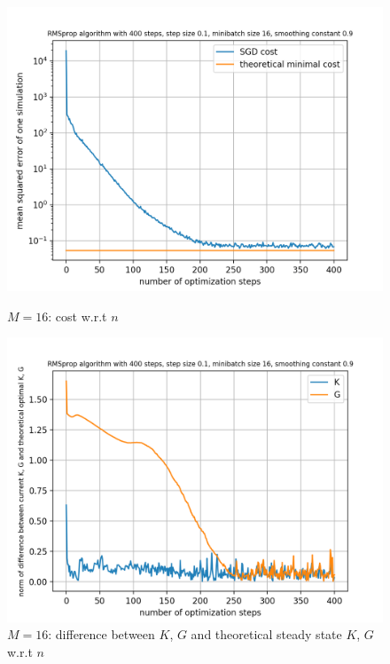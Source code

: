 \documentclass{article}
\begin{document}
\begin{figure}[h!]
	\centering
	\begin{minipage}[t]{.28\paperwidth}
		\centering
		\includegraphics[width=1.0\textwidth]{Figures/M16.png}
		\caption{$M=16$: cost w.r.t $n$}
	\end{minipage}%
	\begin{minipage}[t]{.28\paperwidth}
		\centering
		\includegraphics[width=1.0\textwidth]{Figures/d_M16.png}
		\caption{$M=16$: difference between $K$, $G$ and theoretical steady state $K$, $G$ w.r.t $n$}
	\end{minipage}%
	\begin{minipage}[t]{.28\paperwidth}
		\centering

\end{minipage}
\end{figure}
\end{document}
